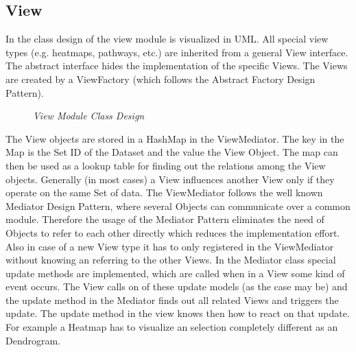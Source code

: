 \subsection{View}

In  the class design of the view module is visualized in UML.
All special view types (e.g. heatmaps, pathways, etc.) are inherited from a general View interface.
The abstract interface hides the implementation of the specific Views.
The Views are created by a ViewFactory (which follows the Abstract Factory Design Pattern).

\begin{figure}[ht]
\centering
{} 
\caption[View Module Class Design]{\textit{View Module Class Design}} 
\label{gfx:view_module_class_design}
\end{figure}

The View objects are stored in a HashMap in the ViewMediator. The key in the Map is the Set ID of the Dataset and the value the View Object. The map can then be used as a lookup table for finding out the relations among the View objects. Generally (in most cases) a View influences another View only if they operate on the same Set of data. 
The ViewMediator follows the well known Mediator Design Pattern, where several Objects can communicate over a common module.
Therefore the usage of the Mediator Pattern eliminates the need of Objects to refer to each other directly which reduces the implementation effort. Also in case of a new View type it has to only registered in the ViewMediator without knowing an referring to the other Views. In the Mediator class special update methods are implemented, which are called when in a View some kind of event occurs. The View calls on of these update models (as the case may be) and the update method in the Mediator finds out all related Views and triggers the update. The update method in the view knows then how to react on that update. For example a Heatmap has to visualize an selection completely different as an Dendrogram.

